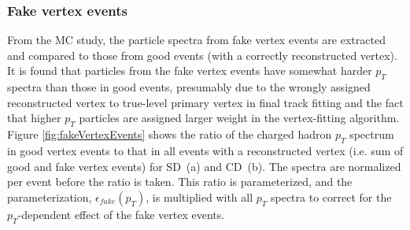 \subsubsection{Fake vertex events}
From the MC study, the particle spectra from fake
vertex events are extracted and compared to those from
good events (with a correctly reconstructed vertex). It
is found that particles from the fake vertex events have
somewhat harder $p_T$ spectra than those in good events,
presumably due to the wrongly assigned reconstructed vertex to true-level primary vertex in final track fitting and the fact that higher $p_T$
particles are assigned larger weight in the vertex-fitting
algorithm. Figure \ref{fig:fakeVertexEvents} shows the ratio of the charged
hadron $p_T$ spectrum in good vertex events to that in all
events with a reconstructed vertex (i.e. sum of good and
fake vertex events) for SD~(a) and CD~(b).
The spectra are normalized per event before the
ratio is taken. This ratio is parameterized, and the parameterization,
$\epsilon_{fake}(p_T)$, is multiplied with all $p_T$ spectra
to correct for the $p_T$-dependent effect of the fake vertex
events. 
